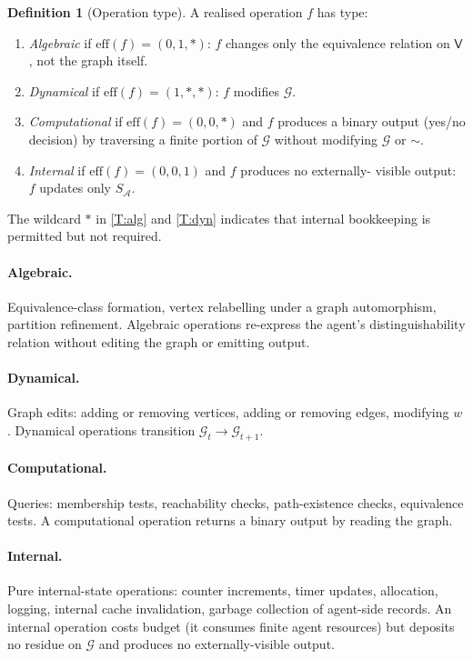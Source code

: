 \documentclass[11pt,twocolumn,a4paper]{article}
\theoremstyle{thmstyle}
\theoremstyle{definition}
\newtheorem{definition}[theorem]{Definition}
\theoremstyle{remark}
\newcommand{\Graph}{\mathcal{G}}
\newcommand{\Vrt}{\mathsf{V}}
\newcommand{\Agent}{\mathcal{A}}
\begin{document}
\begin{definition}[Operation type]
\label{def:op_type}
A realised operation $f$ has type:
\begin{enumerate}[label=(T\arabic*),leftmargin=2.6em,nosep]
\item\label{T:alg} \emph{Algebraic} if
$\mathrm{eff}(f) = (0, 1, *)$: $f$ changes only the equivalence
relation on $\Vrt$, not the graph itself.
\item\label{T:dyn} \emph{Dynamical} if
$\mathrm{eff}(f) = (1, *, *)$: $f$ modifies $\Graph$.
\item\label{T:comp} \emph{Computational} if
$\mathrm{eff}(f) = (0, 0, *)$ and $f$ produces a binary output
(yes/no decision) by traversing a finite portion of $\Graph$
without modifying $\Graph$ or $\sim$.
\item\label{T:int} \emph{Internal} if
$\mathrm{eff}(f) = (0, 0, 1)$ and $f$ produces no externally-
visible output: $f$ updates only $S_\Agent$.
\end{enumerate}
The wildcard $*$ in \ref{T:alg} and \ref{T:dyn} indicates that
internal bookkeeping is permitted but not required.
\end{definition}

\paragraph{Algebraic.} Equivalence-class formation, vertex
relabelling under a graph automorphism, partition refinement.
Algebraic operations re-express the agent's distinguishability
relation without editing the graph or emitting output.

\paragraph{Dynamical.} Graph edits: adding or removing vertices,
adding or removing edges, modifying $w$. Dynamical operations
transition $\Graph_t \to \Graph_{t+1}$.

\paragraph{Computational.} Queries: membership tests, reachability
checks, path-existence checks, equivalence tests. A computational
operation returns a binary output by reading the graph.

\paragraph{Internal.} Pure internal-state operations: counter
increments, timer updates, allocation, logging, internal cache
invalidation, garbage collection of agent-side records. An internal
operation costs budget (it consumes finite agent resources) but
deposits no residue on $\Graph$ and produces no externally-visible
output.
\end{document}
